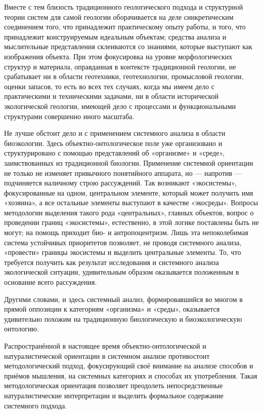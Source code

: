 \documentclass[11pt,a4paper]{article}
\begin{document}
Вместе с тем близость традиционного геологического подхода и структурной
теории систем для самой геологии оборачивается на деле синкретическим
соединением того, что принадлежит практическому опыту работы, и того, что
принадлежит конструируемым идеальным объектам; средства анализа и мыслительные
представления склеиваются со знаниями, которые выступают как изображения
объекта. При этом фокусировка на уровне морфологических структур и материала,
оправданная в контексте традиционной геологии, не срабатывает ни в области
геотехники, геотехнологии, промысловой геологии, оценки запасов, то есть во
всех тех случаях, когда мы имеем дело с практическими и техническими задачами,
ни в области исторической экологической геологии, имеющей дело с процессами и
функциональными структурами совершенно иного масштаба. 

Не лучше обстоит дело и с применением системного анализа в области
биоэкологии. Здесь объектно-онтологическое поле уже организовано и
структурировано с помощью представлений об «организме» и «среде»,
заимствованных из традиционной биологии. Применение системной ориентации не
только не изменяет привычного понятийного аппарата, но — напротив —
подчиняется наличному строю рассуждений. Так возникают «экосистемы»,
фокусированные на одном, центральном элементе, который может получить имя
«хозяина», а все остальные элементы выступают в качестве «экосреды». Вопросы
методологии выделения такого рода «центральных», главных объектов, вопрос о
проведении границ «экосистемы», естественно, в этой логике поставлены быть не
могут; на помощь приходит био- и антропоцентризм. Лишь эта непоколебимая
система устойчивых приоритетов позволяет, не проводя системного анализа,
«провести» границы экосистемы и выделить центральные элементы. То, что
требуется получить как результат исследования и системного анализа
экологической ситуации, удивительным образом оказывается положенным в
основание всего рассуждения. 

Другими словами, и здесь системный анализ, формировавшийся во многом в прямой
оппозиции к категориям «организма» и «среды», оказывается удивительно похожим
на традиционную биологическую и биоэкологическую онтологию. 

Распространённой в настоящее время объектно-онтологической и натуралистической
ориентации в системном анализе противостоит методологический подход,
фокусирующий своё внимание на анализе способов и приёмов мышления, на
системных категориях и способах их употребления. Такая методологическая
ориентация позволяет преодолеть непосредственные натуралистические
интерпретации и выделить формальное содержание системного подхода. 
\end{document}
